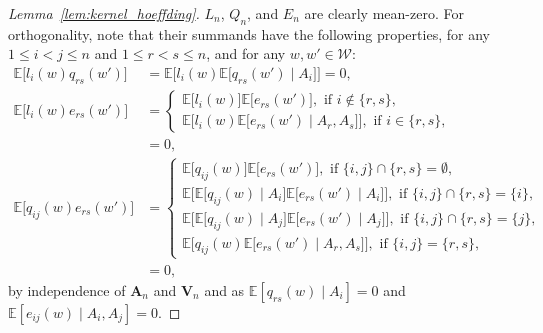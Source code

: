 \documentclass[11pt,lof]{puthesis}
\newcommand{\E}{\ensuremath{\mathbb{E}}}
\newcommand{\bA}{\ensuremath{\mathbf{A}}}
\newcommand{\bV}{\ensuremath{\mathbf{V}}}
\newcommand{\cW}{\ensuremath{\mathcal{W}}}
\theoremstyle{break}
\theoremstyle{proof}
\newtheorem{proof}{Proof}
\begin{document}
\begin{proof}[Lemma~\ref{lem:kernel_hoeffding}]
  $L_n$, $Q_n$, and $E_n$
  are clearly mean-zero.
  For orthogonality,
  note that their summands
  have the following properties,
  for any $1 \leq i < j \leq n$
  and $1 \leq r < s \leq n$,
  and for any $w, w' \in \cW$:
  \begin{align*}
    \E\big[
      l_i(w)
      q_{rs}(w')
    \big]
    &=
    \E\big[
      l_i(w)
      \E\big[
        q_{rs}(w') \mid A_i
      \big]
    \big]
    = 0, \\
    \E\big[
      l_i(w)
      e_{rs}(w')
    \big]
    &=
    \begin{cases}
      \E\big[
        l_i(w)
      \big]
      \E\big[
        e_{rs}(w')
      \big],
      \text{ if } i \notin \{r,s\}, \\
      \E\big[
        l_i(w)
        \E\big[
          e_{rs}(w') \mid A_r, A_s
        \big]
      \big],
      \text{ if } i \in \{r,s\},
    \end{cases} \\
    &=
    0, \\
    \E\big[
      q_{i j}(w)
      e_{rs}(w')
    \big]
    &=
    \begin{cases}
      \E\big[
        q_{i j}(w)
      \big]
      \E\big[
        e_{rs}(w')
      \big],
      \text{ if } \{i,j\} \cap \{r,s\} = \emptyset, \\
      \E\big[
        \E\big[
          q_{i j}(w) \mid A_i
        \big]
        \E\big[
          e_{rs}(w') \mid A_i
        \big]
      \big],
      \text{ if } \{i,j\} \cap \{r,s\} = \{i\}, \\
      \E\big[
        \E\big[
          q_{i j}(w) \mid A_j
        \big]
        \E\big[
          e_{rs}(w') \mid A_j
        \big]
      \big],
      \text{ if } \{i,j\} \cap \{r,s\} = \{j\}, \\
      \E\big[
        q_{i j}(w)
        \E\big[
          e_{rs}(w') \mid A_r, A_s
        \big]
      \big],
      \text{ if } \{i,j\} = \{r,s\},
    \end{cases} \\
    &=
    0,
  \end{align*}
  by independence of $\bA_n$ and $\bV_n$
  and as $\E[q_{rs}(w) \mid A_i] = 0$
  and $\E[e_{i j}(w) \mid A_i, A_j] = 0$.
\end{proof}
\end{document}
